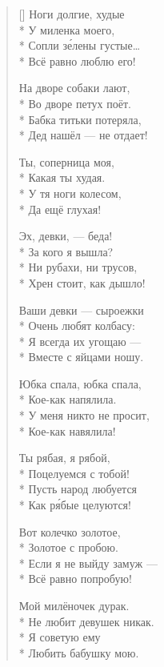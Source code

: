 \documentclass[a4paper,oneside,14pt]{scrbook}
\begin{document}
\begin{verse}[\versewidth]
        Ноги долгие, худые\\*
        У миленка моего,\\*
        Сопли з\'{е}лены густые\ldots\\*
        Всё равно люблю его!
        
        На дворе собаки лают,\\*
        Во дворе петух поёт.\\*
        Бабка титьки потеряла,\\*
        Дед нашёл --- не отдает!
        
        Ты, соперница моя,\\*
        Какая ты худая.\\*
        У тя ноги колесом,\\*
        Да ещё глухая!
        
        Эх, девки, --- беда!\\*
        За кого я вышла?\\*
        Ни рубахи, ни трусов,\\*
        Хрен стоит, как дышло!
        
        Ваши девки --- сыроежки\\*
        Очень любят колбасу:\\*
        Я всегда их угощаю ---\\*
        Вместе с яйцами ношу.
        
        Юбка спала, юбка спала,\\*
        Кое-как напялила.\\*
        У меня никто не просит,\\*
        Кое-как навялила!
        
        Ты рябая, я рябой,\\*
        Поцелуемся с тобой!\\*
        Пусть народ любуется\\*
        Как р\'{я}бые целуются!
        
        Вот колечко золотое,\\*
        Золотое с пробою.\\*
        Если я не выйду замуж --- \\*
        Всё равно попробую!
        
        Мой милёночек дурак.\\*
        Не любит девушек никак.\\*
        Я советую ему\\*
        Любить бабушку мою.
        

\end{verse}
\end{document}
